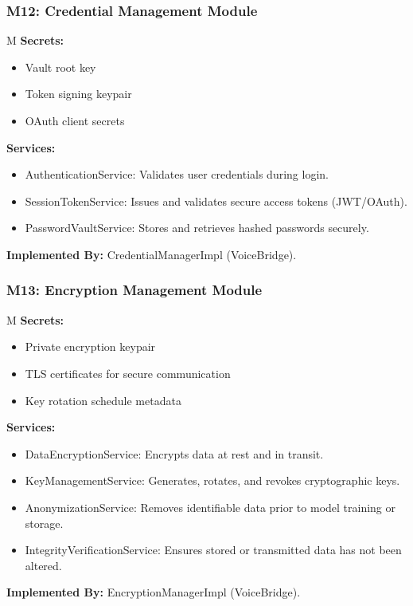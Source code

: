 \documentclass[12pt, titlepage]{article}
\newcounter{mnum}
\newcommand{\mthemnum}{M\themnum}
\begin{document}
\subsubsection*{M12: Credential Management Module} \mthemnum\label{m12}
\textbf{Secrets:}
\begin{itemize}
  \item Vault root key
  \item Token signing keypair
  \item OAuth client secrets
\end{itemize}
\textbf{Services:}
\begin{itemize}
  \item AuthenticationService: Validates user credentials during login.
  \item SessionTokenService: Issues and validates secure access tokens (JWT/OAuth).
  \item PasswordVaultService: Stores and retrieves hashed passwords securely.
\end{itemize}
\textbf{Implemented By:} CredentialManagerImpl (VoiceBridge).

\medskip
\subsubsection*{M13: Encryption Management Module} \mthemnum\label{m13}
\textbf{Secrets:}
\begin{itemize}
  \item Private encryption keypair
  \item TLS certificates for secure communication
  \item Key rotation schedule metadata
\end{itemize}
\textbf{Services:}
\begin{itemize}
  \item DataEncryptionService: Encrypts data at rest and in transit.
  \item KeyManagementService: Generates, rotates, and revokes cryptographic keys.
  \item AnonymizationService: Removes identifiable data prior to model training or storage.
  \item IntegrityVerificationService: Ensures stored or transmitted data has not been altered.
\end{itemize}
\textbf{Implemented By:} EncryptionManagerImpl (VoiceBridge).

\medskip
\end{document}

